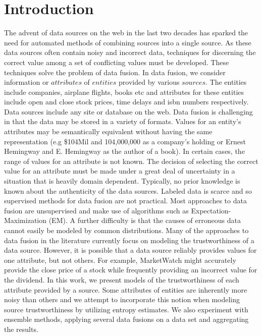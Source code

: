 \documentclass{acm_proc_article-sp}
\begin{document}
\maketitle





\section{Introduction}

The advent of data sources on the web in the last two decades has sparked the need for automated methods of combining sources into a single source. As these data sources often contain noisy and incorrect data, techniques for discerning the correct value among a set of conflicting values must be developed. These techniques solve the problem of data fusion. In data fusion, we consider information or $attributes$ of $entities$ provided by various $sources$. The entities include companies, airplane flights, books etc and attributes for these entities include open and close stock prices, time delays and isbn numbers respectively. Data sources include any site or database on the web. Data fusion is challenging in that the data may be stored in a variety of formats. Values for an entity's attributes may be semantically equivalent without having the same representation (e.g \$104Mil and 104,000,000 as a company's holding or Ernest Hemingway and E. Hemingway as the author of a book). In certain cases, the range of values for an attribute is not known. The decision of selecting the correct value for an attribute must be made under a great deal of uncertainty in a situation that is heavily domain dependent. Typically, no prior knowledge is known about the authenticity of the data sources. Labeled data is scarce and so supervised methods for data fusion are not practical. Most approaches to data fusion are unsupervised and make use of algorithms such as Expectation-Maximization (EM). A further difficulty is that the causes of erroneous data cannot easily be modeled by common distributions. Many of the approaches to data fusion in the literature currently focus on modeling the trustworthiness of a data source. However, it is possible that a data source reliably provides values for one attribute, but not others. For example, MarketWatch might accurately provide the close price of a stock while frequently providing an incorrect value for the dividend. In this work, we present models of the trustworthiness of each attribute provided by a source. Some attributes of entities are inherently more noisy than others and we attempt to incorporate this notion when modeling source trustworthiness by utilizing entropy estimates. We also experiment with ensemble methods, applying several data fusions on a data set and aggregating the results. 
\end{document}
